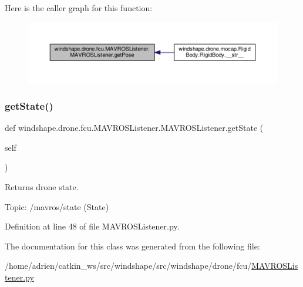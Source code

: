Here is the caller graph for this function\+:\nopagebreak
\begin{figure}[H]
\begin{center}
\leavevmode
\includegraphics[width=350pt]{classwindshape_1_1drone_1_1fcu_1_1_m_a_v_r_o_s_listener_1_1_m_a_v_r_o_s_listener_a7ded0f686fc683775ed94a7481bacea4_icgraph}
\end{center}
\end{figure}
\mbox{\label{classwindshape_1_1drone_1_1fcu_1_1_m_a_v_r_o_s_listener_1_1_m_a_v_r_o_s_listener_a2f38b685fb050dccf2a0eddf244605ca}} 
\subsubsection{\texorpdfstring{get\+State()}{getState()}}
{\footnotesize\ttfamily def windshape.\+drone.\+fcu.\+M\+A\+V\+R\+O\+S\+Listener.\+M\+A\+V\+R\+O\+S\+Listener.\+get\+State (\begin{DoxyParamCaption}\item[{}]{self }\end{DoxyParamCaption})}

\begin{DoxyVerb}Returns drone state.

Topic: /mavros/state (State)
\end{DoxyVerb}
 

Definition at line 48 of file M\+A\+V\+R\+O\+S\+Listener.\+py.



The documentation for this class was generated from the following file\+:\begin{DoxyCompactItemize}
\item 
/home/adrien/catkin\+\_\+ws/src/windshape/src/windshape/drone/fcu/\mbox{\hyperlink{_m_a_v_r_o_s_listener_8py}{M\+A\+V\+R\+O\+S\+Listener.\+py}}\end{DoxyCompactItemize}
